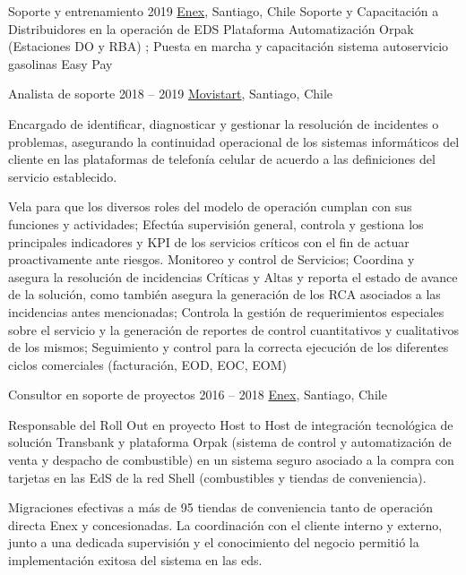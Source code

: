 \begin{joblist}[12.8][8.4][4]


\item[Soporte y entrenamiento]{2019}
  {
  \href{https://www.enex.cl/}{Enex}, Santiago, Chile}
  {
    Soporte y Capacitación a Distribuidores en la operación de EDS Plataforma Automatización Orpak (Estaciones DO y RBA) ; Puesta en marcha y capacitación sistema autoservicio gasolinas Easy Pay
  }
  

\item[Analista de soporte]{2018 -- 2019}
  {
  \href{https://www.movistar.cl/}{Movistart}, Santiago, Chile}
  {
    Encargado de identificar, diagnosticar y gestionar la resolución de incidentes o problemas, asegurando la continuidad operacional de los sistemas informáticos del cliente en las plataformas de telefonía celular de acuerdo a las definiciones del servicio establecido.

    Vela para que los diversos roles del modelo de operación cumplan con sus funciones y actividades; Efectúa supervisión general, controla y gestiona los principales indicadores y KPI de los servicios críticos con el fin de actuar proactivamente ante riesgos.
    Monitoreo y control de Servicios; Coordina y asegura la resolución de incidencias Críticas y Altas y reporta el estado de avance de la solución, como también asegura la generación de los RCA asociados a las incidencias antes mencionadas; Controla la gestión de requerimientos especiales sobre el servicio y la generación de reportes de control cuantitativos y cualitativos de los mismos; Seguimiento y control para la correcta ejecución de los diferentes ciclos comerciales (facturación, EOD, EOC, EOM)
  }

  
\item[Consultor en soporte de proyectos]{2016 -- 2018}
  {
  \href{https://www.enex.cl/}{Enex}, Santiago, Chile}
  {
    Responsable del Roll Out en proyecto Host to Host de integración tecnológica de solución Transbank y plataforma Orpak (sistema de control y automatización de venta y despacho de combustible) en un sistema seguro asociado a la compra con tarjetas en las EdS de la red Shell (combustibles y tiendas de conveniencia).

    \checkmark  Migraciones efectivas a más de 95 tiendas de conveniencia tanto de operación directa Enex y concesionadas. La coordinación con el cliente interno y externo, junto a una dedicada supervisión y el conocimiento del negocio permitió la implementación exitosa del sistema en las eds.

}
\end{joblist}
